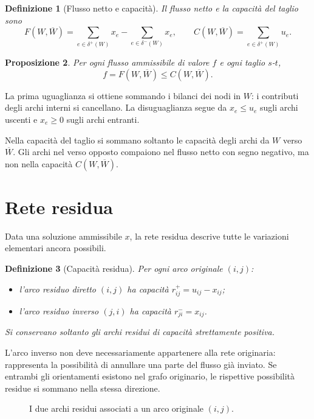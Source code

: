 \documentclass[11pt,a4paper]{article}
\newtheorem{definition}{Definizione}[section]
\newtheorem{proposition}[definition]{Proposizione}
\newcommand{\Wbar}{\overline W}
\begin{document}
\begin{definition}[Flusso netto e capacità]
Il flusso netto e la capacità del taglio sono
\[
F(W,\Wbar)=\sum_{e\in\delta^+(W)}x_e-\sum_{e\in\delta^-(W)}x_e,
\qquad
C(W,\Wbar)=\sum_{e\in\delta^+(W)}u_e.
\]
\end{definition}

\begin{proposition}
Per ogni flusso ammissibile di valore $f$ e ogni taglio $s$-$t$,
\[
f=F(W,\Wbar)\leq C(W,\Wbar).
\]
\end{proposition}

La prima uguaglianza si ottiene sommando i bilanci dei nodi in $W$: i contributi degli archi interni si cancellano. La disuguaglianza segue da $x_e\leq u_e$ sugli archi uscenti e $x_e\geq0$ sugli archi entranti.

\begin{warningbox}
Nella capacità del taglio si sommano soltanto le capacità degli archi da $W$ verso $\Wbar$. Gli archi nel verso opposto compaiono nel flusso netto con segno negativo, ma non nella capacità $C(W,\Wbar)$.
\end{warningbox}

\section{Rete residua}

Data una soluzione ammissibile $x$, la rete residua descrive tutte le variazioni elementari ancora possibili.

\begin{definition}[Capacità residua]
Per ogni arco originale $(i,j)$:
\begin{itemize}[nosep]
\item l'arco residuo diretto $(i,j)$ ha capacità $r_{ij}^{+}=u_{ij}-x_{ij}$;
\item l'arco residuo inverso $(j,i)$ ha capacità $r_{ji}^{-}=x_{ij}$.
\end{itemize}
Si conservano soltanto gli archi residui di capacità strettamente positiva.
\end{definition}

L'arco inverso non deve necessariamente appartenere alla rete originaria: rappresenta la possibilità di annullare una parte del flusso già inviato. Se entrambi gli orientamenti esistono nel grafo originario, le rispettive possibilità residue si sommano nella stessa direzione.

\begin{figure}[ht]
\centering
{}
\caption{I due archi residui associati a un arco originale $(i,j)$.}
\end{figure}
\end{document}
